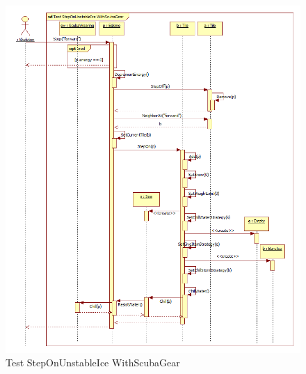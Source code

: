 \begin{figure}[H]
	\begin{center}
		\includegraphics[width=17cm]{chapters/chapter05/diagrams/Test_StepOnUnstableIce_WithScubaGear.png}
		\caption{Test StepOnUnstableIce WithScubaGear}
		\label{fig:Test StepOnUnstableIce WithScubaGear}
	\end{center}
\end{figure}

